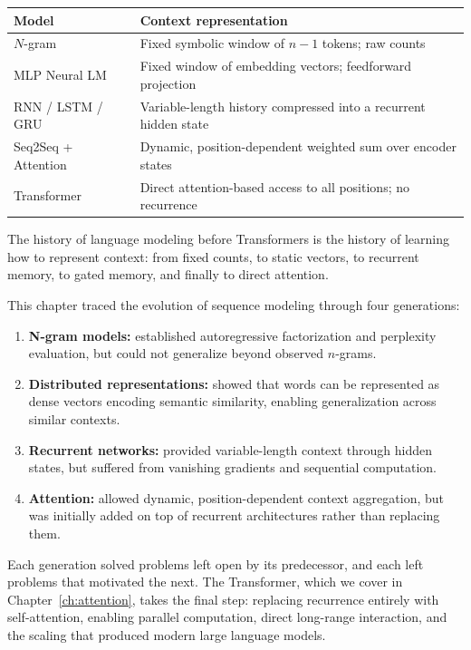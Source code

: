 \begin{center}
\begin{tabularx}{\textwidth}{@{}lX@{}}
\toprule
Model & Context representation \\
\midrule
$N$-gram & Fixed symbolic window of $n{-}1$ tokens; raw counts \\
MLP Neural LM & Fixed window of embedding vectors; feedforward projection \\
RNN / LSTM / GRU & Variable-length history compressed into a recurrent hidden state \\
Seq2Seq + Attention & Dynamic, position-dependent weighted sum over encoder states \\
Transformer & Direct attention-based access to all positions; no recurrence \\
\bottomrule
\end{tabularx}
\end{center}

\noindent The history of language modeling before Transformers is the history of learning how to represent context: from fixed counts, to static vectors, to recurrent memory, to gated memory, and finally to direct attention.

\medskip
This chapter traced the evolution of sequence modeling through four generations:

\begin{enumerate}
    \item \textbf{N-gram models:} established autoregressive factorization and perplexity evaluation, but could not generalize beyond observed $n$-grams.
    \item \textbf{Distributed representations:} showed that words can be represented as dense vectors encoding semantic similarity, enabling generalization across similar contexts.
    \item \textbf{Recurrent networks:} provided variable-length context through hidden states, but suffered from vanishing gradients and sequential computation.
    \item \textbf{Attention:} allowed dynamic, position-dependent context aggregation, but was initially added on top of recurrent architectures rather than replacing them.
\end{enumerate}

Each generation solved problems left open by its predecessor, and each left problems that motivated the next. The Transformer, which we cover in Chapter~\ref{ch:attention}, takes the final step: replacing recurrence entirely with self-attention, enabling parallel computation, direct long-range interaction, and the scaling that produced modern large language models.

